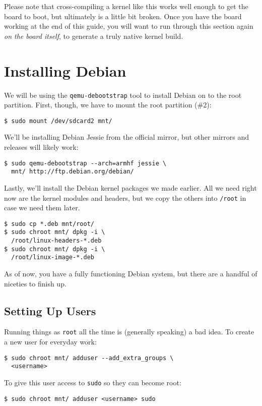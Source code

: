 \documentclass{sockitguide}
\begin{document}
Please note that cross-compiling a kernel like this works well enough
to get the board to boot, but ultimately is a little bit broken. Once
you have the board working at the end of this guide, you will want to
run through this section again \textit{on the board itself}, to
generate a truly native kernel build.

\section{Installing Debian}

We will be using the \texttt{qemu-debootstrap} tool to install Debian on to the
root partition. First, though, we have to mount the root partition
(\#2):
\begin{verbatim}
$ sudo mount /dev/sdcard2 mnt/
\end{verbatim}

We'll be installing Debian Jessie from the official mirror, but other
mirrors and releases will likely work:
\begin{verbatim}
$ sudo qemu-debootstrap --arch=armhf jessie \
  mnt/ http://ftp.debian.org/debian/
\end{verbatim}

Lastly, we'll install the Debian kernel packages we made earlier. All we
need right now are the kernel modules and headers, but we copy the
others into \texttt{/root} in case we need them later.

\begin{verbatim}
$ sudo cp *.deb mnt/root/
$ sudo chroot mnt/ dpkg -i \
  /root/linux-headers-*.deb
$ sudo chroot mnt/ dpkg -i \
  /root/linux-image-*.deb
\end{verbatim}

As of now, you have a fully functioning Debian system, but there are a
handful of niceties to finish up.

\subsection{Setting Up Users}

Running things as \texttt{root} all the time is (generally speaking) a bad
idea. To create a new user for everyday work:
\begin{verbatim}
$ sudo chroot mnt/ adduser --add_extra_groups \
  <username>
\end{verbatim}

To give this user access to \texttt{sudo} so they can become root:
\begin{verbatim}
$ sudo chroot mnt/ adduser <username> sudo
\end{verbatim}
\end{document}
